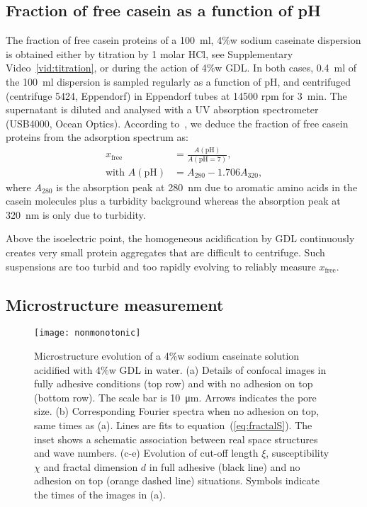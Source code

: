\documentclass[twocolumn,superscriptaddress,showpacs,preprintnumbers,
amsmath,amssymb,prl]{revtex4-1}
\begin{document}
\subsection*{Fraction of free casein as a function of pH}

The fraction of free casein proteins of a \SI{100}{\milli\litre}, 4\%w sodium caseinate dispersion is obtained either by titration by 1 molar HCl, see Supplementary Video~\ref{vid:titration}, or during the action of 4\%w GDL. In both cases, \SI{0.4}{\milli\litre} of the \SI{100}{\milli\litre} dispersion is sampled regularly as a function of pH, and centrifuged (centrifuge 5424, Eppendorf) in Eppendorf tubes at 14500 rpm for \SI{3}{\minute}. The supernatant is diluted and analysed with a UV absorption spectrometer (USB4000, Ocean Optics). According to~\cite{Roefs1986}, we deduce the fraction of free casein proteins from the adsorption spectrum as:
%
\begin{align}
x_\text{free} &= \frac{A(\text{pH})}{A(\text{pH}=7)},\\
\text{with }A(\text{pH}) &= A_{280}-1.706 A_{320},
\end{align}
%
where $A_{280}$ is the absorption peak at \SI{280}{\nano\metre} due to aromatic amino acids in the casein molecules plus a turbidity background whereas the absorption peak at \SI{320}{\nano\metre} is only due to turbidity. 

Above the isoelectric point, the homogeneous acidification by GDL continuously creates very small protein aggregates that are difficult to centrifuge. Such suspensions are too turbid and too rapidly evolving to reliably measure $x_\text{free}$.

\subsection*{Microstructure measurement}

\begin{figure}
	\texttt{[image: nonmonotonic]}%
	\caption{Microstructure evolution of a 4\%w sodium caseinate solution acidified with 4\%w GDL in water. (a) Details of confocal images in fully adhesive conditions (top row) and with no adhesion on top (bottom row). The scale bar is \SI{10}{\micro\metre}. Arrows indicates the pore size. (b) Corresponding Fourier spectra when no adhesion on top, same times as (a). Lines are fits to equation~(\ref{eq:fractalS}). The inset shows a schematic association between real space structures and wave numbers. (c-e) Evolution of cut-off length $\xi$, susceptibility $\chi$ and fractal dimension $d$ in full adhesive (black line) and no adhesion on top (orange dashed line) situations. Symbols indicate the times of the images in (a).}%
	\label{fig:nonmonotonic}%
\end{figure}
\end{document}
